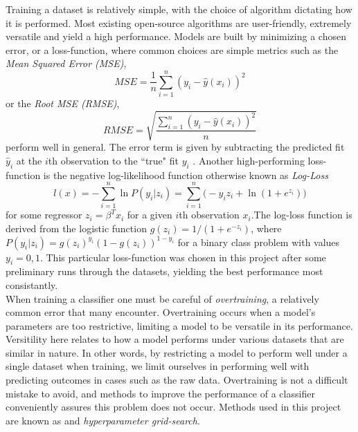 Training a dataset is relatively simple, with the choice of algorithm dictating how it is performed. Most existing open-source algorithms are user-friendly, extremely versatile and yield a high performance. Models are built by minimizing a chosen error, or a loss-function, where common choices are simple metrics such as the \textit{Mean Squared Error (MSE)}, 
\begin{equation}
    MSE = \frac{1}{n} \sum\limits_{i=1}^{n}(y_i-\hat{y}(x_i))^2
    \label{eq:MSE}
\end{equation}
or the \textit{Root MSE (RMSE)},
\begin{equation}
    RMSE = \sqrt{\frac{\sum\limits_{i=1}^{n}(y_i-\hat{y}(x_i))^2}{n}}
    \label{eq:RMSE}
\end{equation}
perform well in general. The error term is given by subtracting the predicted fit $\hat{y}_i$ at the $i$th observation to the ``true" fit $y_i$ \cite{james2013introduction}. Another high-performing loss-function is the negative log-likelihood function otherwise known as \textit{Log-Loss}
\begin{equation}
    l(x) = -\sum\limits_{i=1}^{n} \ln P(y_i| z_i) = \sum\limits_{i=1}^{n} \Big(-y_i z_i + \ln(1+e^{z_i}) \Big)
    \label{eq:logloss}
\end{equation}
for some regressor $z_i=\beta^T x_i$ for a given $i$th observation $x_i$.The log-loss function is derived from the logistic function $g(z_i)=1/(1+e^{-z_i})$, where $P(y_i| z_i) = g(z_i)^{y_i}(1-g(z_i))^{1-y_i}$ for a binary class problem with values $y_i=0,1$. This particular loss-function was chosen in this project after some preliminary runs through the datasets, yielding the best performance most consistantly. \\

When training a classifier one must be careful of \textit{overtraining}, a relatively common error that many encounter. Overtraining occurs when a model's parameters are too restrictive, limiting a model to be versatile in its performance. Versitility here relates to how a model performs under various datasets that are similar in nature. In other words, by restricting a model to perform well under a single dataset when training, we limit ourselves in performing well with predicting outcomes in cases such as the raw data. Overtraining is not a difficult mistake to avoid, and methods to improve the performance of a classifier conveniently assures this problem does not occur. Methods used in this project are known as  and \textit{hyperparameter grid-search}. \\

